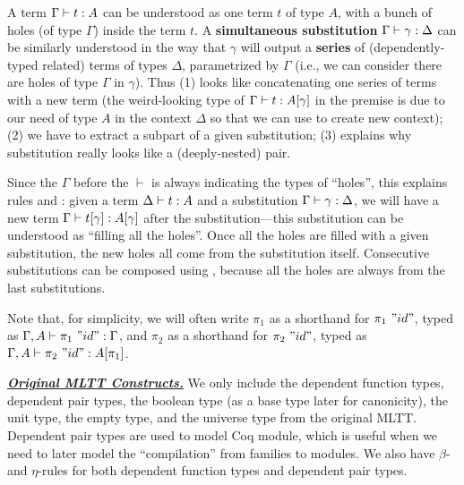 A term ${ {\Gamma} \vdash {t} : {A} }$ can be understood as one term $t$ of
type $A$, with a bunch of holes (of type $\Gamma$) inside the term $t$.
A \textbf{simultaneous substitution} ${ {\Gamma} \vdash {\gamma} : {\Delta} }$ can be similarly
understood in the way that $\gamma$ will output a \textbf{series} of
(dependently-typed related) terms of types $\Delta$, parametrized by
$\Gamma$ (i.e., we can consider there are holes of type $\Gamma$ in $\gamma$).
Thus (1)  looks like concatenating one
series of terms with a new term (the weird-looking type of
${ {\Gamma} \vdash {t} : {A[\gamma]} }$ in the premise is due to our need of type $A$ in
the context $\Delta$ so that we can use  to
create new context); (2) we have  to extract a
subpart of a given substitution; (3)  explains why
substitution really looks like a (deeply-nested) pair. 

Since the $\Gamma$ before the $\vdash$ is always indicating the types of
``holes'', this explains rules  and : given a term ${ {\Delta} \vdash {t} : {A} }$ and a substitution
${ {\Gamma} \vdash {\gamma} : {\Delta} }$, we will have a new term
${ {\Gamma} \vdash {t[\gamma]} : {A[\gamma]} }$ after the substitution---this
substitution can be understood as ``filling all the holes''. Once all
the holes are filled with a given substitution, the new holes all come
from the substitution itself.
Consecutive substitutions can be composed using , because
all the holes are always from the last substitutions.

Note that, for simplicity, we will often write $\pi_1$ as a
shorthand for ${\pi_1~"id"}$, typed as
${ {\Gamma,A} \vdash {\pi_1~"id"} : {\Gamma} }$, and $\pi_2$ as a shorthand
for $\pi_2~"id"$, typed as ${ {\Gamma, A} \vdash {\pi_2~"id"} : {A[\pi_1]} }$.


\underline{\textit{\textbf{Original MLTT Constructs.}}}
We only include  the dependent function types, dependent pair types,
the boolean type (as a base type later for canonicity), the unit type,
the empty type, and the universe type from the original MLTT. Dependent
pair types are used to model Coq module, which is useful when we need to
later model the ``compilation'' from families to modules. We also have
$\beta$- and $\eta$-rules for both dependent function types and
dependent pair types. 

